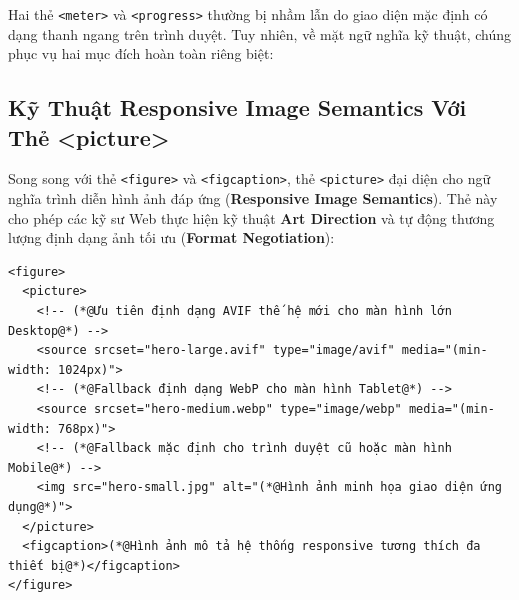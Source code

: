 \documentclass[11pt,oneside]{book}
\newcommand{\thd}[1]{\textcolor{white}{\textbf{\strut #1}}}
\newcommand{\codeinline}[1]{\textcolor{accentOrange}{\texttt{#1}}}
\newcommand{\term}[1]{\textbf{\textcolor{primaryBlue}{#1}}}
\begin{document}
Hai thẻ \codeinline{<meter>} và \codeinline{<progress>} thường bị nhầm lẫn do giao diện mặc định có dạng thanh ngang trên trình duyệt. Tuy nhiên, về mặt ngữ nghĩa kỹ thuật, chúng phục vụ hai mục đích hoàn toàn riêng biệt:

\begin{prettyTableBox}
\end{prettyTableBox}

\Needspace*{120pt}
\subsection{Kỹ Thuật Responsive Image Semantics Với Thẻ <picture>}

Song song với thẻ \codeinline{<figure>} và \codeinline{<figcaption>}, thẻ \codeinline{<picture>} đại diện cho ngữ nghĩa trình diễn hình ảnh đáp ứng (\term{Responsive Image Semantics}). Thẻ này cho phép các kỹ sư Web thực hiện kỹ thuật \term{Art Direction} và tự động thương lượng định dạng ảnh tối ưu (\term{Format Negotiation}):

\begin{codeWindow}
\begin{lstlisting}[language=HTML5]
<figure>
  <picture>
    <!-- (*@Ưu tiên định dạng AVIF thế hệ mới cho màn hình lớn Desktop@*) -->
    <source srcset="hero-large.avif" type="image/avif" media="(min-width: 1024px)">
    <!-- (*@Fallback định dạng WebP cho màn hình Tablet@*) -->
    <source srcset="hero-medium.webp" type="image/webp" media="(min-width: 768px)">
    <!-- (*@Fallback mặc định cho trình duyệt cũ hoặc màn hình Mobile@*) -->
    <img src="hero-small.jpg" alt="(*@Hình ảnh minh họa giao diện ứng dụng@*)">
  </picture>
  <figcaption>(*@Hình ảnh mô tả hệ thống responsive tương thích đa thiết bị@*)</figcaption>
</figure>
\end{lstlisting}
\end{codeWindow}
\end{document}
